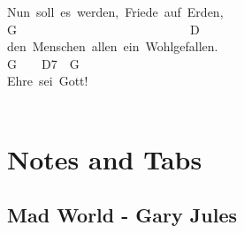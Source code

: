 \documentclass[]{book}
\let\stdsection\section
\renewcommand\section{\clearpage\stdsection}
\begin{document}
Nun~soll~es~werden,~Friede~auf~Erden,\\
G~~~~~~~~~~~~~~~~~~~~~~~~~~~~D\\
den~Menschen~allen~ein~Wohlgefallen.\\
G~~~~D7~~G\\
Ehre~sei~Gott!\\
~\\

\hypertarget{notes-and-tabs}{%
\chapter{Notes and Tabs}\label{notes-and-tabs}}

\hypertarget{mad-world---gary-jules-1}{%
\section{Mad World - Gary Jules}\label{mad-world---gary-jules-1}}
\end{document}
